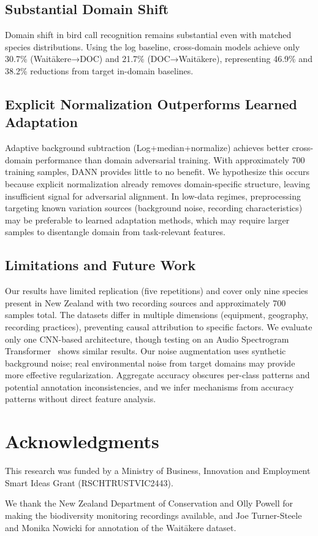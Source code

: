 \documentclass[peer-review]{fa2026}
\begin{document}
\subsection{Substantial Domain Shift}

Domain shift in bird call recognition remains substantial even with matched species distributions. Using the log baseline, cross-domain models achieve only 30.7\% (Wait\=akere→DOC) and 21.7\% (DOC→Wait\=akere), representing 46.9\% and 38.2\% reductions from target in-domain baselines.

\subsection{Explicit Normalization Outperforms Learned Adaptation}

Adaptive background subtraction (Log+median+normalize) achieves better cross-domain performance than domain adversarial training. With approximately 700 training samples, DANN provides little to no benefit. We hypothesize this occurs because explicit normalization already removes domain-specific structure, leaving insufficient signal for adversarial alignment. In low-data regimes, preprocessing targeting known variation sources (background noise, recording characteristics) may be preferable to learned adaptation methods, which may require larger samples to disentangle domain from task-relevant features.

\subsection{Limitations and Future Work}

Our results have limited replication (five repetitions) and cover only nine species present in New Zealand  with two recording sources and approximately 700 samples total. The datasets differ in multiple dimensions (equipment, geography, recording practices), preventing causal attribution to specific factors. We evaluate only one CNN-based architecture, though testing on an Audio Spectrogram Transformer~\cite{ast} shows similar results. Our noise augmentation uses synthetic background noise; real environmental noise from target domains may provide more effective regularization. Aggregate accuracy obscures per-class patterns and potential annotation inconsistencies, and we infer mechanisms from accuracy patterns without direct feature analysis.

\section*{Acknowledgments}

This research was funded by a Ministry of Business, Innovation and Employment Smart Ideas Grant (RSCHTRUSTVIC2443). 

We thank the New Zealand Department of Conservation and Olly Powell for making the biodiversity monitoring recordings available, and Joe Turner-Steele and Monika Nowicki for annotation of the Wait\=akere dataset. 

\printbibliography
\end{document}
